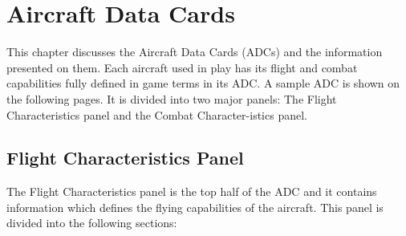 \section{Aircraft Data Cards}

This chapter discusses the Aircraft Data Cards (ADCs) and the information presented on them. Each aircraft used in play has its flight and combat capabilities fully defined in game terms in its ADC. A sample ADC is shown on the following pages.  It is divided into two major panels: The Flight Characteristics panel and the Combat Character-istics panel.

\subsection{Flight Characteristics Panel}


    
The Flight Characteristics panel is the top half of the ADC and it contains information which defines the flying capabilities of the aircraft. This panel is divided into the following sections:

